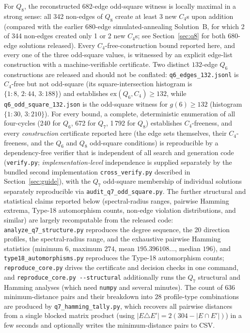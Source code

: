 \documentclass[12pt,a4paper]{article}
\theoremstyle{definition}
\newcommand{\ex}{\mathrm{ex}}
\begin{document}
For $Q_8$, the reconstructed 682-edge odd-square witness is locally maximal
in a strong sense: all 342 non-edges of $Q_8$ create at least 3 new $C_4$s
upon addition (compared with the earlier 680-edge simulated-annealing
Solution~B, for which 2 of 344 non-edges created only 1 or 2 new $C_4$s;
see Section~\ref{sec:q8} for both 680-edge solutions released). Every
$C_4$-free-construction bound reported here, and every one of the three
odd-square values, is witnessed by an explicit edge-list construction
with a machine-verifiable certificate. Two distinct $132$-edge $Q_6$
constructions are released and should not be conflated:
\texttt{q6\_edges\_132.jsonl} is $C_4$-free but not odd-square (its
square-intersection histogram is $\{1{:}8,\,2{:}44,\,3{:}188\}$) and
establishes $\ex(Q_6,C_4)\ge132$, while
\texttt{q6\_odd\_square\_132.json} is the odd-square witness for
$g(6)\ge132$ (histogram $\{1{:}30,\,3{:}210\}$). For every bound, a complete, deterministic enumeration of
all four-cycles (240 for $Q_6$, 672 for $Q_7$, 1\,792 for $Q_8$) establishes
$C_4$-freeness, and every \emph{construction} certificate reported here
(the edge sets themselves, their $C_4$-freeness, and the $Q_6$ and
$Q_8$ odd-square conditions) is reproducible by a dependency-free
verifier that is independent of all search and generation code
(\texttt{verify.py}; \emph{implementation-level} independence is supplied
separately by the bundled second implementation \texttt{cross\_verify.py}
described in Section~\ref{sec:guide}), with the $Q_7$
odd-square membership of individual solutions separately reproducible
via \texttt{audit\_q7\_odd\_square.py}. The further structural and
statistical claims reported below (spectral-radius ranges, pairwise
Hamming extrema, Type-18 automorphism counts, non-edge violation
distributions, and similar) are largely recomputable from the released
code: \texttt{analyze\_q7\_structure.py} reproduces the degree sequence,
the 20 direction profiles, the spectral-radius range, and the exhaustive
pairwise Hamming statistics (minimum $6$, maximum $274$, mean
$195.396108\ldots$, median $196$), and \texttt{type18\_automorphisms.py}
reproduces the Type-18 automorphism counts; \texttt{reproduce\_core.py}
drives the certificate and decision checks in one command, and
\texttt{reproduce\_core.py -{}-structural} additionally runs the $Q_7$
structural and Hamming analyses (which need \texttt{numpy} and several
minutes). The count of $636$ minimum-distance
pairs and their breakdown into $28$ profile-type combinations are produced by
\texttt{q7\_hamming\_tally.py}, which recovers all pairwise distances from a
single blocked matrix product (using
$|E\triangle E'|=2(304-|E\cap E'|)$) in a few seconds and optionally writes
the minimum-distance pairs to CSV.
\end{document}
